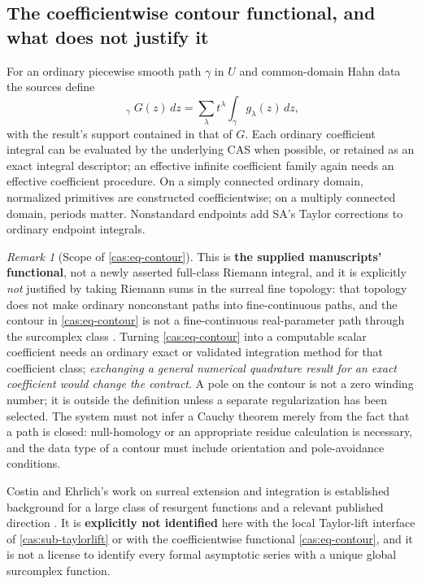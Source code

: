 \documentclass[11pt,letterpaper]{article}
\numberwithin{equation}{section}
\theoremstyle{definition}
\theoremstyle{remark}
\newtheorem{remark}[theorem]{Remark}
\newcommand{\HInt}{\mathop{\int^{\!H}}\nolimits}
\begin{document}
\subsection{The coefficientwise contour functional, and what does not justify it}
\label{cas:sub-coefficientwise}
For an ordinary piecewise smooth path $\gamma$ in $U$ and common-domain Hahn
data the sources define
\begin{equation}\label{cas:eq-contour}
 \HInt_\gamma G(z)\,dz=\sum_\lambda t^\lambda\int_\gamma g_\lambda(z)\,dz ,
\end{equation}
with the result's support contained in that of $G$. Each ordinary coefficient
integral can be evaluated by the underlying CAS when possible, or retained as an
exact integral descriptor; an effective infinite coefficient family again needs
an effective coefficient procedure. On a simply connected ordinary domain,
normalized primitives are constructed coefficientwise; on a multiply connected
domain, periods matter. Nonstandard endpoints add SA's Taylor corrections to
ordinary endpoint integrals.

\begin{remark}[Scope of \eqref{cas:eq-contour}]\label{cas:rem-contourscope}
This is \textbf{the supplied manuscripts' functional}, not a newly asserted
full-class Riemann integral, and it is explicitly \emph{not} justified by taking
Riemann sums in the surreal fine topology: that topology does not make ordinary
nonconstant paths into fine-continuous paths, and the contour in
\eqref{cas:eq-contour} is not a fine-continuous real-parameter path through the
surcomplex class \cite{cas:SourceAnalysisTwo,cas:SourceCT}. Turning
\eqref{cas:eq-contour} into a computable scalar coefficient needs an ordinary
exact or validated integration method for that coefficient class;
\emph{exchanging a general numerical quadrature result for an exact coefficient
would change the contract}. A pole on the contour is not a zero winding number;
it is outside the definition unless a separate regularization has been selected.
The system must not infer a Cauchy theorem merely from the fact that a path is
closed: null-homology or an appropriate residue calculation is necessary, and
the data type of a contour must include orientation and pole-avoidance
conditions.
\end{remark}

Costin and Ehrlich's work on surreal extension and integration is established
background for a large class of resurgent functions and a relevant published
direction \cite{cas:CostinEhrlich}. It is \textbf{explicitly not identified}
here with the local Taylor-lift interface of \cref{cas:sub-taylorlift} or with
the coefficientwise functional \eqref{cas:eq-contour}, and it is not a license
to identify every formal asymptotic series with a unique global surcomplex
function.
\end{document}
